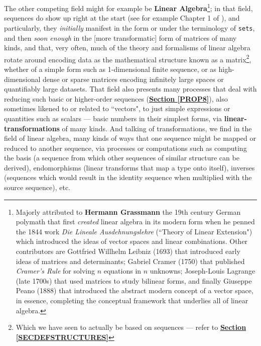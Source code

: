 \documentclass[a4paper, 18pt]{book} %
\begin{document}
\begin{appendices}
The other competing field might for example be \textbf{Linear Algebra}\footnote{Majorly\cite{copilot_dna_assistant} attributed  to \textbf{Hermann Grassmann} the 19th century German polymath that first \textit{created} linear algebra in its modern form when he penned the 1844 work \textit{Die Lineale Ausdehnungslehre} (``Theory of Linear Extension") which introduced the ideas of vector spaces and linear combinations.  Other contributors\cite{copilot_dna_assistant} are Gottfried Willhelm Leibniz (1693) that introduced early ideas of matrices and determinants; Gabriel Cramer (1750) that published \textit{Cramer's Rule} for solving $n$ equations in $n$ unknowns; Joseph-Louis Lagrange (late 1700s) that used matrices to study bilinear forms, and finally Giuseppe Peano (1888) that introduced the abstract modern concept of a vector space, in essence, completing the conceptual framework that underlies all of linear algebra.}; in that field, sequences do show up right at the start (see for example Chapter 1 of \cite{nef1967linear}), and particularly, they \textit{initially} manifest in the form or under the terminology of \texttt{sets}, and then \textit{soon enough} in the [more transformatic] form of matrices of many kinds, and that, very often, much of the theory and formalisms of linear algebra rotate around encoding data as the mathematical structure known as a matrix\footnote{Which we have seen to actually be based on sequences --- refer to \textbf{\hyperref[SECDEFSTRUCTURES]{Section \ref{SECDEFSTRUCTURES}}}}, whether of a simple form such as 1-dimensional finite sequence, or as high-dimensional dense or sparse matrices encoding infinitely large spaces or quantifiably large datasets. That field also presents many processes that deal with reducing such basic or higher-order sequences (\textbf{\hyperref[PROP8]{Section \ref{PROP8}}}), also sometimes likened to or related to ``vectors", to just simple expressions or quantities such as scalars --- basic numbers in their simplest forms, via \textbf{linear-transformations} of many kinds. And talking of transformations, we find in the field of linear algebra, many kinds of ways that one sequence might be mapped or reduced to another sequence, via processes or computations such as computing the basis (a sequence from which other sequences of similar structure can be derived), endomorphisms (linear transforms that map a type onto itself), inverses (sequences which would result in the identity sequence when multiplied with the source sequence), etc.\cite{nef1967linear}


\end{appendices}
\end{document}
